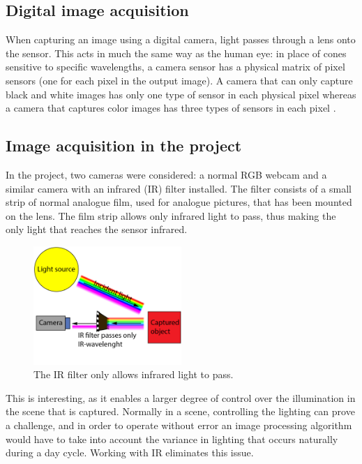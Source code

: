 \subsection{Digital image acquisition}
When capturing an image using a digital camera, light passes through a lens onto the sensor. This acts in much the same way as the human eye: in place of cones sensitive to specific wavelengths, a camera sensor has a physical matrix of pixel sensors (one for each pixel in the output image). A camera that can only capture black and white images has only one type of sensor in each physical pixel whereas a camera that captures color images has three types of sensors in each pixel \citep{ip_book}.

\subsection{Image acquisition in the project}
In the project, two cameras were considered: a normal RGB webcam and a similar camera with an infrared (IR) filter installed. The filter consists of a small strip of normal analogue film, used for analogue pictures, that has been mounted on the lens. The film strip allows only infrared light to pass, thus making the only light that reaches the sensor infrared.

\begin{figure}[htbp] 
\centering 
\includegraphics[width=0.5\textwidth]{Pictures/Theory/IR_filter.png} 
\caption{The IR filter only allows infrared light to pass.} 
\label{fig:ir_filter} 
\end{figure}

This is interesting, as it enables a larger degree of control over the illumination in the scene that is captured. Normally in a scene, controlling the lighting \citep{ip_book} can prove a challenge, and in order to operate without error an image processing algorithm would have to take into account the variance in lighting that occurs naturally during a day cycle. Working with IR eliminates this issue.

